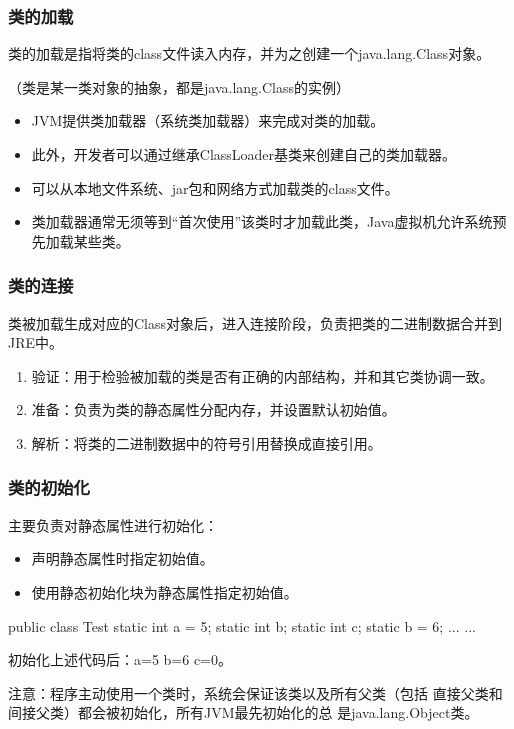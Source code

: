 \begin{frame}[fragile] %
\frametitle{类的加载}

类的加载是指将类的class文件读入内存，并为之创建一个java.lang.Class对象。

{\Red\kai（类是某一类对象的抽象，都是java.lang.Class的实例）}


\begin{itemize}\kai
\item JVM提供类加载器（系统类加载器）来完成对类的加载。
\item 此外，开发者可以通过继承ClassLoader基类来创建自己的类加载器。
\item 可以从本地文件系统、jar包和网络方式加载类的class文件。
\item 类加载器通常无须等到“首次使用”该类时才加载此类，Java虚拟机允许系统预先加载某些类。
\end{itemize}
\end{frame}

\begin{frame}[fragile] %
\frametitle{类的连接}

类被加载生成对应的Class对象后，进入连接阶段，负责把类的二进制数据合并到JRE中。

\begin{enumerate}
\item 验证：用于检验被加载的类是否有正确的内部结构，并和其它类协调一致。
\item 准备：负责为类的静态属性分配内存，并设置默认初始值。
\item 解析：将类的二进制数据中的符号引用替换成直接引用。
\end{enumerate}
\end{frame}

\begin{frame}[fragile] %
\frametitle{类的初始化}

主要负责对静态属性进行初始化：
\begin{itemize}
\item 声明静态属性时指定初始值。
\item 使用静态初始化块为静态属性指定初始值。
\end{itemize}

\begin{javaCode}
public class Test {
  static int a = 5;
  static int b;
  static int c;
  static {
    b = 6;
  }
  ... ...
}  
\end{javaCode}
初始化上述代码后：a=5 b=6 c=0。

{\kai\Red 注意：程序主动使用一个类时，系统会保证该类以及所有父类（包括
  直接父类和间接父类）都会被初始化，所有JVM最先初始化的总
  是java.lang.Object类。}
\end{frame}


